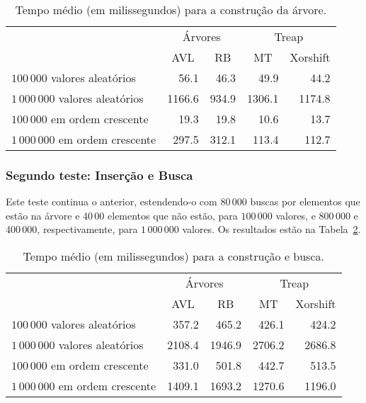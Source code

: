 \begin{table}[h]
    \centering
    \begin{tabular}{l r r r r}
        \cmidrule{2-5}
        & \multicolumn{2}{c}{Árvores} & \multicolumn{2}{c}{Treap} \\
        \cmidrule(r){2-3} \cmidrule(l){4-5}
        & \multicolumn{1}{c}{AVL} & \multicolumn{1}{c}{RB} & \multicolumn{1}{c}{MT} & \multicolumn{1}{c}{Xorshift} \\
        \midrule
        $100\,000$ valores aleatórios & 56.1 & 46.3 & 49.9 & 44.2 \\
        $1\,000\,000$ valores aleatórios & 1166.6 & 934.9 & 1306.1 & 1174.8 \\
        $100\,000$ em ordem crescente & 19.3 & 19.8 & 10.6 & 13.7 \\
        $1\,000\,000$ em ordem crescente & 297.5 & 312.1 & 113.4 & 112.7 \\
        \bottomrule
    \end{tabular}
    \caption{Tempo médio (em milissegundos) para a construção da árvore.}
    \label{tab:insert}
\end{table}

\subsubsection{Segundo teste: Inserção e Busca}

Este teste continua o anterior,
estendendo-o com $80\,000$ buscas por elementos que estão na árvore
e $40\,00$ elementos que não estão, para $100\,000$ valores,
e $800\,000$ e $400\,000$, respectivamente, para $1\,000\,000$ valores.
Os resultados estão na Tabela~\ref{tab:insert-remove}.

\begin{table}[h]
    \centering
    \begin{tabular}{l r r r r}
        \cmidrule{2-5}
        & \multicolumn{2}{c}{Árvores} & \multicolumn{2}{c}{Treap} \\
        \cmidrule(r){2-3} \cmidrule(l){4-5}
        & \multicolumn{1}{c}{AVL} & \multicolumn{1}{c}{RB} & \multicolumn{1}{c}{MT} & \multicolumn{1}{c}{Xorshift} \\
        \midrule
        $100\,000$ valores aleatórios & 357.2 & 465.2 & 426.1 & 424.2 \\
        $1\,000\,000$ valores aleatórios & 2108.4 & 1946.9 & 2706.2 & 2686.8 \\
        $100\,000$ em ordem crescente & 331.0 & 501.8 & 442.7 & 513.5 \\
        $1\,000\,000$ em ordem crescente & 1409.1 & 1693.2 & 1270.6 & 1196.0 \\
        \bottomrule
    \end{tabular}
    \caption{Tempo médio (em milissegundos) para a construção e busca.}
    \label{tab:insert-remove}
\end{table}

